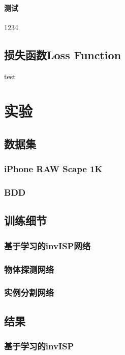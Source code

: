 \documentclass[winfonts]{njuthesis}
\begin{document}
\subsubsection{测试}
1234

\section{损失函数Loss Function}

test


\chapter{实验}



\section{数据集}

\subsection{iPhone RAW Scape 1K}

\subsection{BDD}

\section{训练细节}

\subsection{基于学习的invISP网络}

\subsection{物体探测网络}

\subsection{实例分割网络}

\section{结果}

\subsection{基于学习的invISP}
\end{document}
